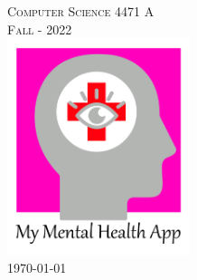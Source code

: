 \documentclass[11pt]{article}
\begin{document}
\begin{titlepage}
        \Large \textsc{Computer Science 4471 A}\\ %
        \textsc{Fall - 2022}\\ %

        \vfill\vfill
        \includegraphics[width=0.4\textwidth]{Picture1}
        \\[1cm]

        \vfill %
        \vfill
        {\LARGE\today} %


%



        \vfill %
        \vfill
        \vfill
        \vfill
    \end{titlepage}
\end{document}
